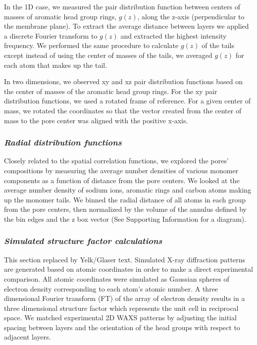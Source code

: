 \documentclass[journal=jpcbfk,manusciprt=article]{achemso}
\begin{document}
  In the 1D case, we measured the pair distribution function between centers of
  masses of aromatic head group rings, $g(z)$, along the z-axis (perpendicular to
  the membrane plane). To extract the average distance between layers we applied
  a discrete Fourier transform to $g(z)$ and extracted the highest intensity
  frequency. We performed the same procedure to calculate $g(z)$ of the tails 
  except instead of using the center of masses of the tails, we averaged $g(z)$
  for each atom that makes up the tail.

  In two dimensions, we observed xy and xz pair distribution functions based on
  the center of masses of the aromatic head group rings. For the xy pair
  distribution functions, we used a rotated frame of reference. For a given center
  of mass, we rotated the coordinates so that the vector created from the center
  of mass to the pore center was aligned with the positive x-axis. 



  \subsubsection{\textit{Radial distribution functions}}
  Closely related to the spatial correlation functions, we explored the pores'
  compositions by measuring the average number densities of various monomer
  components as a function of distance from the pore centers. We looked at the
  average number density of sodium ions, aromatic rings and carbon atoms making
  up the monomer tails. We binned the radial distance of all atoms in each group
  from the pore centers, then normalized by the volume of the annulus defined by
  the bin edges and the z box vector (See Supporting Information for a 
  diagram). 

  \subsubsection{\textit{Simulated structure factor calculations}}
  {\color{red}This section replaced by Yelk/Glaser text}. 
  Simulated X-ray diffraction patterns are generated based on atomic
  coordinates in order to make a direct experimental comparison. All atomic
  coordinates were simulated as Gaussian spheres of electron density
  corresponding to each atom's atomic number. A three dimensional Fourier
  transform (FT) of the array of electron density results in a three dimensional
  structure factor which represents the unit cell in reciprocal space. We matched
  experimental 2D WAXS patterns by adjusting the initial spacing between layers
  and the orientation of the head groups with respect to adjacent layers.
\end{document}
